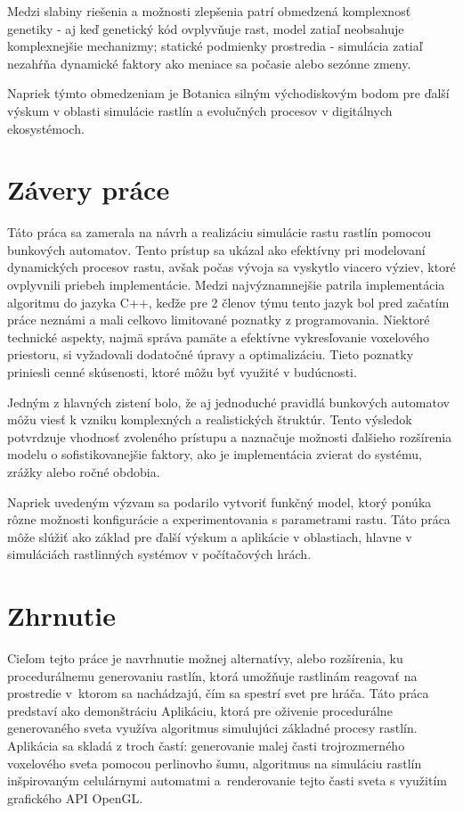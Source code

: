 \documentclass[12pt]{article}
\begin{document}
Medzi slabiny riešenia a možnosti zlepšenia patrí obmedzená komplexnosť
genetiky - aj keď genetický kód ovplyvňuje rast, model zatiaľ neobsahuje
komplexnejšie mechanizmy; statické podmienky prostredia - simulácia zatiaľ
nezahŕňa dynamické faktory ako meniace sa počasie alebo sezónne zmeny.

Napriek týmto obmedzeniam je Botanica silným východiskovým bodom pre ďalší
výskum v oblasti simulácie rastlín a evolučných procesov v digitálnych
ekosystémoch.

\section{Závery práce}

Táto práca sa zamerala na návrh a realizáciu simulácie rastu rastlín pomocou
bunkových automatov. Tento prístup sa ukázal ako efektívny pri modelovaní
dynamických procesov rastu, avšak počas vývoja sa vyskytlo viacero výziev,
ktoré ovplyvnili priebeh implementácie. Medzi najvýznamnejšie patrila
implementácia algoritmu do jazyka C++, keďže pre 2 členov týmu tento jazyk
bol pred začatím práce neznámi a mali celkovo limitované poznatky
z programovania. Niektoré technické aspekty, najmä správa pamäte a efektívne
vykresľovanie voxelového priestoru, si vyžadovali dodatočné úpravy
a optimalizáciu. Tieto poznatky priniesli cenné skúsenosti, ktoré môžu byť
využité v budúcnosti.

Jedným z hlavných zistení bolo, že aj jednoduché pravidlá bunkových automatov
môžu viesť k vzniku komplexných a realistických štruktúr. Tento výsledok
potvrdzuje vhodnosť zvoleného prístupu a naznačuje možnosti ďalšieho rozšírenia
modelu o sofistikovanejšie faktory, ako je implementácia zvierat do systému,
zrážky alebo ročné obdobia.

Napriek uvedeným výzvam sa podarilo vytvoriť funkčný model, ktorý ponúka rôzne
možnosti konfigurácie a experimentovania s parametrami rastu. Táto práca môže
slúžiť ako základ pre ďalší výskum a aplikácie v oblastiach, hlavne v simuláciách
rastlinných systémov v počítačových hrách.


\section{Zhrnutie}

Cieľom tejto práce je navrhnutie možnej alternatívy, alebo rozšírenia,
ku procedurálnemu generovaniu rastlín, ktorá umožňuje rastlinám reagovať na
prostredie v~ktorom sa nachádzajú, čím sa spestrí svet pre hráča. Táto práca
predstaví ako demonštráciu Aplikáciu, ktorá pre oživenie procedurálne
generovaného sveta využíva algoritmus simulujúci základné procesy rastlín.
Aplikácia sa skladá z troch častí: generovanie malej časti trojrozmerného
voxelového sveta pomocou perlinovho šumu, algoritmus na simuláciu rastlín
inšpirovaným celulárnymi automatmi a~renderovanie tejto časti sveta s
využitím grafického API OpenGL.


\nocite{*} %
\renewcommand{\refname}{Zoznam použitej literatúry}

\end{document}
